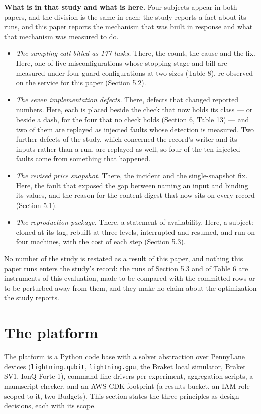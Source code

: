 \documentclass[acmsmall,screen,review]{acmart}
\begin{document}
\textbf{What is in that study and what is here.} Four subjects appear in both papers, and the division is the same in each: the study reports a fact about its runs, and this paper reports the mechanism that was built in response and what that mechanism was measured to do.


\begin{itemize}
\item \textit{The sampling call billed as 177 tasks.} There, the count, the cause and the fix. Here, one of five misconfigurations whose stopping stage and bill are measured under four guard configurations at two sizes (Table 8), re-observed on the service for this paper (Section 5.2).
\item \textit{The seven implementation defects.} There, defects that changed reported numbers. Here, each is placed beside the check that now holds its class --- or beside a dash, for the four that no check holds (Section 6, Table 13) --- and two of them are replayed as injected faults whose detection is measured. Two further defects of the study, which concerned the record's writer and its inputs rather than a run, are replayed as well, so four of the ten injected faults come from something that happened.
\item \textit{The revised price snapshot.} There, the incident and the single-snapshot fix. Here, the fault that exposed the gap between naming an input and binding its values, and the reason for the content digest that now sits on every record (Section 5.1).
\item \textit{The reproduction package.} There, a statement of availability. Here, a subject: cloned at its tag, rebuilt at three levels, interrupted and resumed, and run on four machines, with the cost of each step (Section 5.3).
\end{itemize}

No number of the study is restated as a result of this paper, and nothing this paper runs enters the study's record: the runs of Section 5.3 and of Table 6 are instruments of this evaluation, made to be compared with the committed rows or to be perturbed away from them, and they make no claim about the optimization the study reports.


\section{The platform}

The platform is a Python code base with a solver abstraction over PennyLane \cite{ref41} devices (\texttt{lightning.qubit}, \texttt{lightning.gpu}, the Braket local simulator, Braket SV1, IonQ Forte-1), command-line drivers per experiment, aggregation scripts, a manuscript checker, and an AWS CDK footprint (a results bucket, an IAM role scoped to it, two Budgets). This section states the three principles as design decisions, each with its scope.
\end{document}

